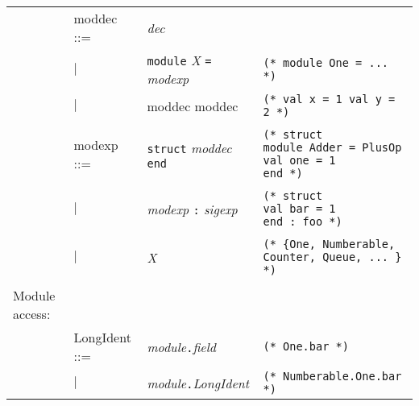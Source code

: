 \begin{tabular}{p{4em} p{7em} p{11em} p{16em}}
                & moddec ::=
                  & \textit{dec}
                    & \\
                & $|$
                  & \texttt{module} \textit{X} \texttt{=} \textit{modexp}
                    & \texttt{(* module One = ... *)} \\
                &$|$
                  & moddec moddec
                    & \texttt{(* val x = 1 val y = 2 *)} \\
                \\
                & modexp ::=
                  & \texttt{struct} \textit{moddec} \texttt{end}
                    & \parbox[t]{15em}{\texttt{(* struct} \\
                                \texttt{module Adder = PlusOp} \\
                                \texttt{val one = 1} \\
                              \texttt{end *)}}
                              \\\\
                & $|$
                  & \textit{modexp} \texttt{:} \textit{sigexp}
                    & \parbox[t]{10em}{\texttt{(* struct} \\
                                \texttt{val bar = 1} \\
                              \texttt{end : foo *)}} \\\\
                & $|$
                  & \textit{X}
                    & \texttt{(* \{One, Numberable, Counter, Queue, ... \} *)}  \\
                \\                    
Module access:  &&& \\
                & LongIdent ::=
                  & \textit{module}\texttt{.}\textit{field}
                    & \texttt{(* One.bar *)} \\
                &$|$
                  & \textit{module}\texttt{.}\textit{LongIdent}
                    & \texttt{(* Numberable.One.bar *)} \\
\end{tabular}